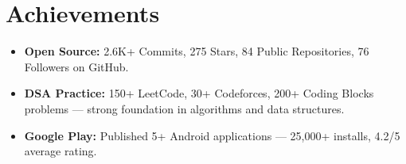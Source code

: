 \documentclass[letterpaper,11pt]{article}
\newcommand{\resumeItem}[1]{
  \item\small{#1 \vspace{-2pt}}
}
\newcommand{\resumeSubHeadingListStart}{\begin{itemize}[leftmargin=0.15in, label={}]}
\newcommand{\resumeSubHeadingListEnd}{\end{itemize}}
\begin{document}
\section{Achievements}
\resumeSubHeadingListStart
  \resumeItem{\textbf{Open Source:} 2.6K+ Commits, 275 Stars, 84 Public Repositories, 76 Followers on GitHub.}
  \resumeItem{\textbf{DSA Practice:} 150+ LeetCode, 30+ Codeforces, 200+ Coding Blocks problems — strong foundation in algorithms and data structures.}
  \resumeItem{\textbf{Google Play:} Published 5+ Android applications — 25,000+ installs, 4.2/5 average rating.}
\resumeSubHeadingListEnd

\end{document}
